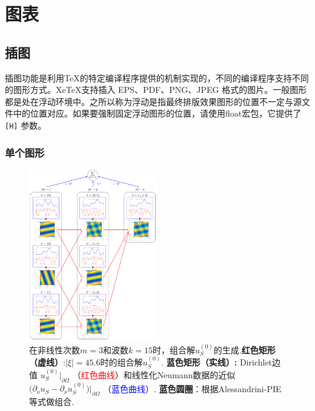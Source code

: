 
\chapter{图表}
\section{插图}
插图功能是利用TeX的特定编译程序提供的机制实现的，不同的编译程序支持不同的图形方式。XeTeX支持插入 EPS、PDF、PNG、JPEG 格式的图片。一般图形都是处在浮动环境中。之所以称为浮动是指最终排版效果图形的位置不一定与源文
件中的位置对应。如果要强制固定浮动图形的位置，请使用float宏包，它提供了 \texttt{[H]} 参数。

\subsection{单个图形}
\begin{figure}[H]
    \begin{center}
        \includegraphics[width=0.5\textwidth]{./figs/cost.png}
\caption[Alessandrini-PIE等式与组合解$u_{S}^{(0)}$]{在非线性次数$m=3$和波数$k=15$时，组合解$u_{S}^{(0)}$的生成.\textbf{红色矩形（虚线）}:$|\xi| = 45.6$时的组合解$u_{S}^{(0)}$.
\textbf{蓝色矩形（实线）:} Dirichlet边值 $u_{S}^{(0)} \big|_{\partial\Omega}$ （\textcolor{red}{红色曲线}）和线性化Neumann数据的近似$\big( \partial_{\nu} u_{S} - \partial_{\nu} u_{S}^{(0)} \big) \big|_{\partial\Omega}$ （\textcolor{blue}{蓝色曲线}）.
\textbf{蓝色圆圈}：根据Alessandrini-PIE等式做组合.}
\label{fig:superposition}
\end{center}
\end{figure}

